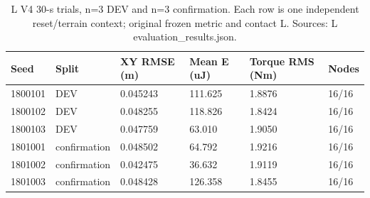 \begin{table}[t]
\centering\small
\caption{L V4 30-s trials, n=3 DEV and n=3 confirmation. Each row is one independent reset/terrain context; original frozen metric and contact L. Sources: L evaluation\_results.json.}
\label{tab:full_horizon}
\begin{tabular}{llllll}
\hline
Seed & Split & XY RMSE (m) & Mean E (uJ) & Torque RMS (Nm) & Nodes \\
\hline
1800101 & DEV & 0.045243 & 111.625 & 1.8876 & 16/16 \\
1800102 & DEV & 0.048255 & 118.826 & 1.8424 & 16/16 \\
1800103 & DEV & 0.047759 & 63.010 & 1.9050 & 16/16 \\
1801001 & confirmation & 0.048502 & 64.792 & 1.9216 & 16/16 \\
1801002 & confirmation & 0.042475 & 36.632 & 1.9119 & 16/16 \\
1801003 & confirmation & 0.048428 & 126.358 & 1.8455 & 16/16 \\
\hline
\end{tabular}
\end{table}
